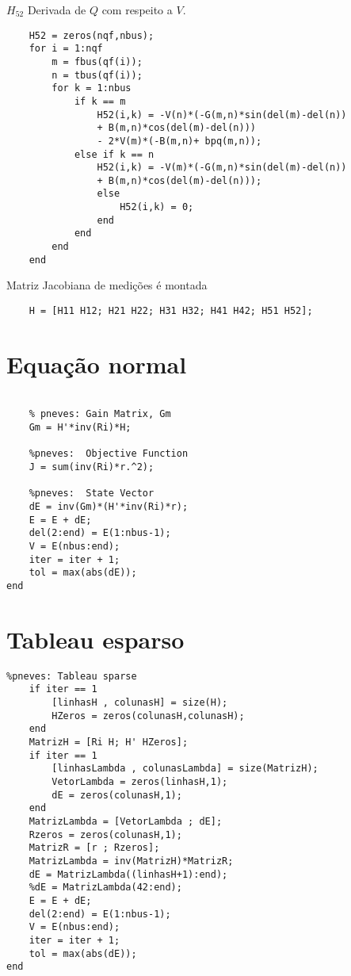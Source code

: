 $H_{52}$ Derivada de $Q$ com respeito a $V$.
\begin{verbatim}    
    H52 = zeros(nqf,nbus);
    for i = 1:nqf
        m = fbus(qf(i));
        n = tbus(qf(i));
        for k = 1:nbus
            if k == m
                H52(i,k) = -V(n)*(-G(m,n)*sin(del(m)-del(n)) 
                + B(m,n)*cos(del(m)-del(n))) 
                - 2*V(m)*(-B(m,n)+ bpq(m,n));
            else if k == n
                H52(i,k) = -V(m)*(-G(m,n)*sin(del(m)-del(n)) 
                + B(m,n)*cos(del(m)-del(n)));
                else
                    H52(i,k) = 0;
                end
            end
        end
    end

\end{verbatim}
Matriz Jacobiana de medições é montada
\begin{verbatim}
    H = [H11 H12; H21 H22; H31 H32; H41 H42; H51 H52];
\end{verbatim}
\section{Equação normal}
\label{SectionEqNormal}
\begin{verbatim}
    
    % pneves: Gain Matrix, Gm
    Gm = H'*inv(Ri)*H;
    
    %pneves:  Objective Function
    J = sum(inv(Ri)*r.^2);  
    
    %pneves:  State Vector
    dE = inv(Gm)*(H'*inv(Ri)*r);
    E = E + dE;
    del(2:end) = E(1:nbus-1);
    V = E(nbus:end);
    iter = iter + 1;
    tol = max(abs(dE));
end

\end{verbatim}
\section{Tableau esparso}
\label{SectionTableau}
\begin{verbatim}
%pneves: Tableau sparse 
    if iter == 1
        [linhasH , colunasH] = size(H);
        HZeros = zeros(colunasH,colunasH);
    end
    MatrizH = [Ri H; H' HZeros];
    if iter == 1
        [linhasLambda , colunasLambda] = size(MatrizH);
        VetorLambda = zeros(linhasH,1);
        dE = zeros(colunasH,1);
    end
    MatrizLambda = [VetorLambda ; dE];
    Rzeros = zeros(colunasH,1);
    MatrizR = [r ; Rzeros];
    MatrizLambda = inv(MatrizH)*MatrizR;
    dE = MatrizLambda((linhasH+1):end);
    %dE = MatrizLambda(42:end);
    E = E + dE;
    del(2:end) = E(1:nbus-1);
    V = E(nbus:end);
    iter = iter + 1;
    tol = max(abs(dE));
end
\end{verbatim}

